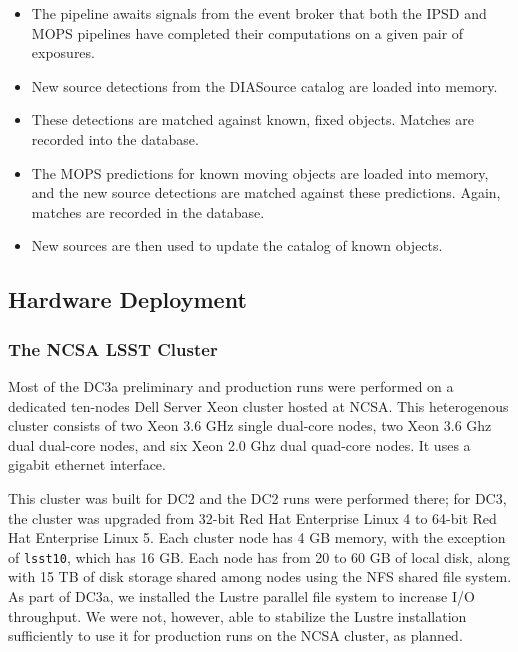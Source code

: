 \begin{itemize}

\item The pipeline awaits signals from the event broker that
both the IPSD and MOPS pipelines have completed their computations
on a given pair of exposures.

\item New source detections from the DIASource catalog are loaded 
into memory.

\item These detections are matched against known, fixed objects.
Matches are recorded into the database.

\item The MOPS predictions for known moving objects are loaded 
into memory, and the new source detections are matched against
these predictions. Again, matches are recorded in the database.

\item New sources are then used to update the catalog of known
objects.

\end{itemize}

\subsection{Hardware Deployment}

\subsubsection{The NCSA LSST Cluster}

Most of the DC3a preliminary and production runs were performed on a dedicated 
ten-nodes Dell Server Xeon cluster hosted at NCSA. This heterogenous cluster 
consists of two Xeon 3.6 GHz single dual-core nodes, two Xeon 3.6 Ghz dual
dual-core nodes, and six Xeon 2.0 Ghz dual quad-core nodes. It uses a
gigabit ethernet interface.

This cluster was built for DC2 and the DC2 runs were performed there; for DC3, 
the cluster was upgraded from 32-bit Red Hat Enterprise Linux 4 to 64-bit
Red Hat Enterprise Linux 5. Each cluster node has 4 GB memory, with the exception
of \texttt{lsst10}, which has 16 GB. Each node has from 20 to 60 GB of local disk,
along with 15 TB of disk storage shared among nodes using the NFS shared file system.
As part of DC3a, we installed the Lustre parallel file system to increase I/O 
throughput. We were not, however, able to stabilize the Lustre installation
sufficiently to use it for production runs on the NCSA cluster, as planned.

